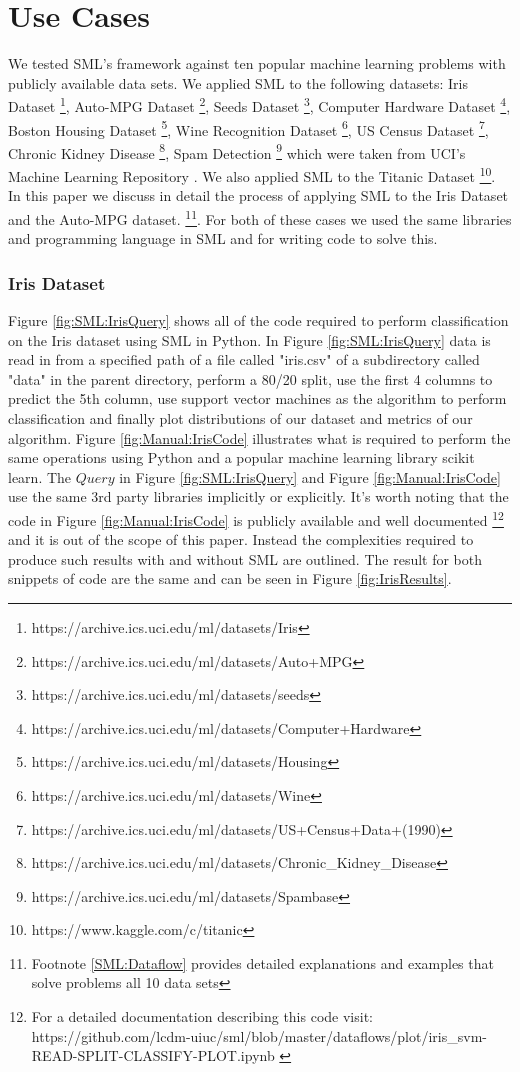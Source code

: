 \documentclass[jair,twoside,11pt,theapa]{article}
\begin{document}
\section{Use Cases}
\label{use-cases}

We tested SML's framework against ten popular machine learning problems with publicly available data sets. We applied SML to the following datasets: Iris Dataset \footnote{https://archive.ics.uci.edu/ml/datasets/Iris}, Auto-MPG Dataset \footnote{https://archive.ics.uci.edu/ml/datasets/Auto+MPG}, Seeds Dataset \footnote{https://archive.ics.uci.edu/ml/datasets/seeds}, Computer Hardware Dataset \footnote{https://archive.ics.uci.edu/ml/datasets/Computer+Hardware}, Boston Housing Dataset \footnote{https://archive.ics.uci.edu/ml/datasets/Housing}, Wine Recognition Dataset \footnote{https://archive.ics.uci.edu/ml/datasets/Wine}, US Census Dataset \footnote{https://archive.ics.uci.edu/ml/datasets/US+Census+Data+(1990)}, Chronic Kidney Disease \footnote{https://archive.ics.uci.edu/ml/datasets/Chronic\_Kidney\_Disease}, Spam Detection \footnote{https://archive.ics.uci.edu/ml/datasets/Spambase} which were taken from UCI's Machine Learning Repository \cite{Lichman:2013}. We also applied SML to the Titanic Dataset \footnote{https://www.kaggle.com/c/titanic}. In this paper we discuss in detail the process of applying SML to the Iris Dataset and the Auto-MPG dataset. \footnote{Footnote \ref{SML:Dataflow} provides detailed explanations and examples that solve problems all 10 data sets}. For both of these cases we used the same libraries and programming language in SML and for writing code to solve this.

\subsubsection{Iris Dataset}
Figure \ref{fig:SML:IrisQuery} shows all of the code required to perform classification on the Iris dataset using SML in Python. In Figure \ref{fig:SML:IrisQuery} data is read in from a specified path of a file called "iris.csv" of a subdirectory called "data" in the parent directory, perform a 80/20 split, use the first 4 columns to predict the 5th column, use support vector machines as the algorithm to perform classification and finally plot distributions of our dataset  and metrics of our algorithm. Figure \ref{fig:Manual:IrisCode} illustrates what is required to perform the same operations using Python and a popular machine learning library scikit learn. The \(Query\) in Figure \ref{fig:SML:IrisQuery} and Figure \ref{fig:Manual:IrisCode} use the same 3rd party libraries implicitly or explicitly. It's worth noting that the code in Figure \ref{fig:Manual:IrisCode} is publicly available and well documented \footnote{For a detailed documentation describing this code visit: https://github.com/lcdm-uiuc/sml/blob/master/dataflows/plot/iris\_svm-READ-SPLIT-CLASSIFY-PLOT.ipynb \label{lab:iris:git}} and it is out of the scope of this paper. Instead the complexities required to produce such results with and without SML are outlined. The result for both snippets of code are the same and can be seen in Figure \ref{fig:IrisResults}.
\end{document}
